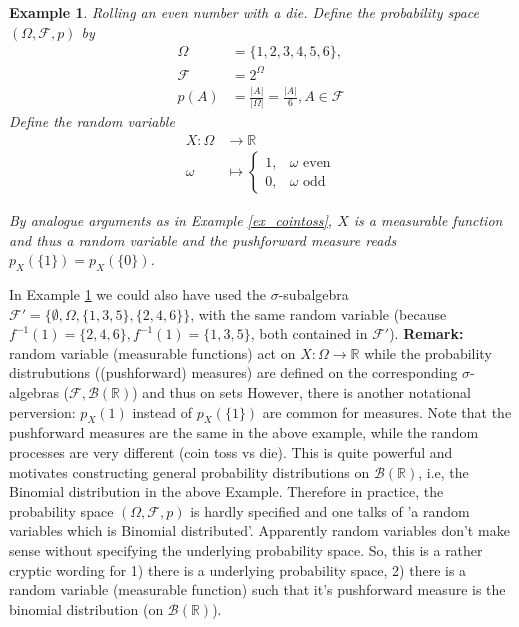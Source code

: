 \documentclass[10pt,a4paper]{article}
\newtheorem{example}{Example}
\begin{document}
\begin{example}\textit{Rolling an even number with a die.} \label{ex_die}
Define the probability space $(\Omega, \mathcal F, p)$ by  
	\begin{align*}
		\Omega &= \{1,2,3,4,5,6\}, \\
		\mathcal F &= 2 ^\Omega \\
		p(A) &= \frac{|A|}{|\Omega|} = \frac{|A|}{6}, A \in \mathcal F
	\end{align*}
	Define the random variable
	\begin{align*}
		X : \Omega &\rightarrow \mathbb R   \\
		\omega &\mapsto \begin{cases}
			1, & \omega \text{ even} \\
			0, & \omega \text{ odd} 
		\end{cases}
	\end{align*}

By analogue arguments as in Example \ref{ex_cointoss}, $X$ is a measurable function and thus a random variable and the pushforward measure reads $p_X(\{1\}) = p_X(\{0\})$.
\end{example}
\noindent
In Example \ref{ex_die} we could also have used the $\sigma$-subalgebra $\mathcal F' = \{\emptyset, \Omega, \{1, 3, 5\}, \{2,4,6\}  \} $, with the same random variable (because $f^{-1}(1) = \{2,4,6 \}, f^{-1}(1) = \{1,3,5 \} $, both contained in $\mathcal F'$). 
\newline
\newline
\noindent
\textbf{Remark:}  random variable  (measurable functions) act on $X: \Omega \rightarrow \mathbb R$ while the probability distrubutions ((pushforward) measures) are defined on the corresponding $\sigma$-algebras ($\mathcal F, \mathcal B (\mathbb R) $) and thus on sets  
However, there is another notational perversion:   $p_X(1)$ instead of $p_X(\{1\})$ are common for measures. 
Note that the pushforward measures are the same in the above example, while the random processes are very different (coin toss vs die). This is quite powerful and motivates constructing general probability distributions on $\mathcal B (\mathbb R)$, i.e, the Binomial distribution in the above Example. 
Therefore in practice,  the probability space $(\Omega, \mathcal F, p)$ is hardly specified and one talks of 'a random variables which is Binomial distributed'. Apparently random variables don't make sense without specifying the underlying probability space. So, this is a rather cryptic wording for 1) there is a underlying probability space, 2) there is a random variable (measurable function) such that it's pushforward measure is the binomial distribution (on $\mathcal B(\mathbb R) $).
\end{document}
